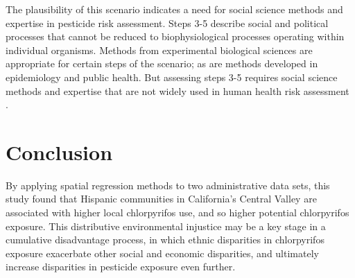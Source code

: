 \documentclass[ijerph,article,submit,oneauthor,pdftex]{Definitions/mdpi}
\begin{document}
The plausibility of this scenario indicates a need for social science methods and expertise in pesticide risk assessment. Steps 3-5 describe social and political processes that cannot be reduced to biophysiological processes operating within individual organisms. Methods from experimental biological sciences are appropriate for certain steps of the scenario; as are methods developed in epidemiology and public health. But assessing steps 3-5 requires social science methods and expertise that are not widely used in human health risk assessment \citep{HarrisonWeEcologyNot2017}.

\hypertarget{conclusion}{%
\section{Conclusion}\label{conclusion}}

By applying spatial regression methods to two administrative data sets, this study found that Hispanic communities in California's Central Valley are associated with higher local chlorpyrifos use, and so higher potential chlorpyrifos exposure. This distributive environmental injustice may be a key stage in a cumulative disadvantage process, in which ethnic disparities in chlorpyrifos exposure exacerbate other social and economic disparities, and ultimately increase disparities in pesticide exposure even further. 


\vspace{6pt} 




\end{document}

